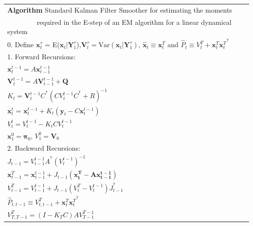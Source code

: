 \documentclass[fleqn]{article}
\newcommand{\T}{^{\ensuremath{\mathsf{T}}}}           %
\providecommand{\mb}[1]{\boldsymbol{#1}}
\newcommand{\bx}{\mb{x}}
\newcommand{\by}{\mb{y}}
\newcommand{\bY}{\mb{Y}}
\begin{document}
\begin{tabular}{l}
\hline
\textbf{Algorithm } Standard Kalman Filter Smoother for estimating the moments \\
$\qquad\quad\quad$ required in the E-step of an EM algorithm for a linear dynamical system\\
\hline
0. Define $\bx_t^{\tau}$ = E($\bx_t|\bY_1^{\tau}$),$\mathbf{V}_t^{\tau}=\text{Var}(\bx_t|\bY_1^{\tau})$, $\hat{\bx}_t \equiv \bx_t^T$ and $\hat{P}_t\equiv V_t^T+\bx_t^T{\bx_t^T}^{\T}$\\
1. Forward Recursions:\\
\hspace{4 mm} $\bx_t^{t-1}=A\bx_{t-1}^{t-1}$\\
\hspace{4 mm} $\mathbf{V}_t^{t-1}=A\mathbf{V}_{t-1}^{t-1}+\mathbf{Q}$\\
\hspace{4 mm} $K_t=\mathbf{V}_t^{t-1}C^{\T}(CV_t^{t-1}C^{\T}+R)^{-1}$\\
\hspace{4 mm} $\bx_t^t$ = $\bx_t^{t-1} + K_t (\by_t - C\bx_t^{t-1})$\\
\hspace{4 mm} $V_t^t=V_t^{t-1}-K_tCV_t^{t-1}$\\
\hspace{4 mm} $\bx_1^0=\mathbf{\pi}_0$, $V_1^0=\mathbf{V}_0$\\
2. Backward Recursions:\\
\hspace{4 mm} $J_{t-1} = V_{t-1}^{t-1}A^{\T}(V_t^{t-1})^{-1}$\\
\hspace{4 mm} $\bx_{t-1}^T=\bx_{t-1}^{t-1}+J_{t-1}(\mathbf{x_t^T-A\bx_{t-1}^{t-1}})$\\
\hspace{4 mm} $V_{t-1}^T = V_{t-1}^{t-1}+J_{t-1}(V_t^T-V_t^{t-1})J_{t-1}^{\T}$\\
\hspace{4 mm} $\hat{P}_{t,t-1}\equiv V_{t,t-1}^T+\bx_t^T{\bx_t^T}^{\T}$\\
\hspace{4 mm} $V_{T,T-1}^T=(I-K_TC)AV_{T-1}^{T-1}$\\
\hline
\end{tabular}

\newpage
\end{document}
